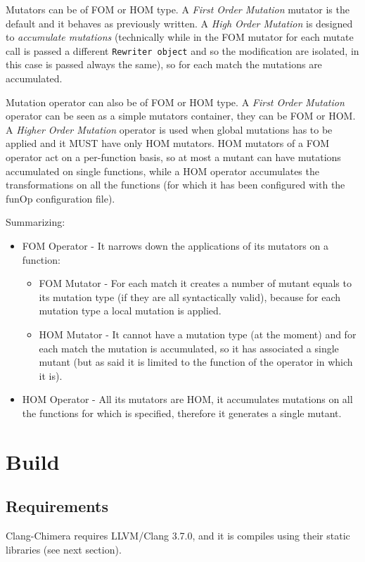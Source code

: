 \documentclass[10pt,a4paper]{article}
\begin{document}
Mutators can be of FOM or HOM type. A \textit{First Order Mutation} mutator is the default and it behaves as previously written. A \textit{High Order Mutation} is designed to \textit{accumulate mutations} (technically while in the FOM mutator for each mutate call is passed a different \texttt{Rewriter object} and so the modification are isolated, in this case is passed always the same), so for each match the mutations are accumulated. 

Mutation operator can also be of FOM or HOM type. A \textit{First Order Mutation} operator can be seen as a simple mutators container, they can be FOM or HOM. A \textit{Higher Order Mutation} operator is used when global mutations has to be applied and it MUST have only HOM mutators. HOM mutators of a FOM operator act on a per-function basis, so at most a mutant can have mutations accumulated on single functions, while a HOM operator accumulates the transformations on all the functions (for which it has been configured with the funOp configuration file).

Summarizing:
\begin{itemize}
\item FOM Operator - It narrows down the applications of its mutators on a function:
\begin{itemize}
\item FOM Mutator - For each match it creates a number of mutant equals to its mutation type (if they are all syntactically valid), because for each mutation type a local mutation is applied.
\item HOM Mutator - It cannot have a mutation type (at the moment) and for each match the mutation is accumulated, so it has associated a single mutant (but as said it is limited to the function of the operator in which it is).
\end{itemize}
\item HOM Operator - All its mutators are HOM, it accumulates mutations on all the functions for which is specified, therefore it generates a single mutant.
\end{itemize}

\section{Build}
\subsection{Requirements}
Clang-Chimera requires LLVM/Clang 3.7.0, and it is compiles using their static libraries (see next section).
\end{document}
